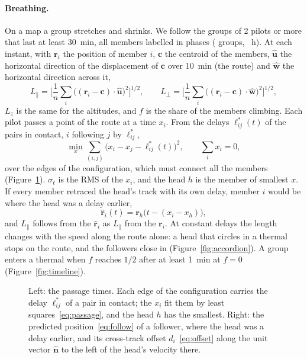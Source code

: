 \paragraph{Breathing.}\label{sec:breathing} On a map a group stretches and shrinks. We follow the
groups of 2 pilots or more that last at least 30~min, all members labelled in phases
(\StBrGroups{} groups, \StBrHours~h). At each instant, with $\mathbf r_i$ the position of member
$i$, $\mathbf c$ the centroid of the members, $\hat{\mathbf u}$ the horizontal direction of the
displacement of $\mathbf c$ over 10~min (the route) and $\hat{\mathbf w}$ the horizontal direction
across it,
\begin{equation}\label{eq:lengths}
L_\parallel=\Big[\frac1n\sum_i\big((\mathbf r_i-\mathbf c)\cdot\hat{\mathbf u}\big)^2\Big]^{1/2},
\qquad
L_\perp=\Big[\frac1n\sum_i\big((\mathbf r_i-\mathbf c)\cdot\hat{\mathbf w}\big)^2\Big]^{1/2},
\end{equation}
$L_z$ is the same for the altitudes, and $f$ is the share of the members climbing. Each pilot
passes a point of the route at a time $x_i$. From the delays $\ell^*_{ij}(t)$ of the pairs in
contact, $i$ following $j$ by $\ell^*_{ij}$,
\begin{equation}\label{eq:passage}
\min_{x}\sum_{(i,j)}\big(x_i-x_j-\ell^*_{ij}(t)\big)^2,\qquad \sum_i x_i=0,
\end{equation}
over the edges of the configuration, which must connect all the members (Figure~\ref{fig:passage}). $\sigma_\ell$ is the RMS
of the $x_i$, and the head $h$ is the member of smallest $x$. If every member retraced the head's
track with its own delay, member $i$ would be where the head was a delay earlier,
\begin{equation}\label{eq:follow}
\hat{\mathbf r}_i(t)=\mathbf r_h\big(t-(x_i-x_h)\big),
\end{equation}
and $\hat L_\parallel$ follows from the $\hat{\mathbf r}_i$ as $L_\parallel$ from the $\mathbf r_i$.
At constant delays the length changes with the speed along the route alone: a head that circles in
a thermal stops on the route, and the followers close in (Figure~\ref{fig:accordion}). A group enters a thermal when $f$
reaches $1/2$ after at least 1~min at $f=0$ (Figure~\ref{fig:timeline}).

\begin{figure}
\centering

\caption{Left: the passage times. Each edge of the configuration carries the delay $\ell^*_{ij}$ of
a pair in contact; the $x_i$ fit them by least squares~\eqref{eq:passage}, and the head $h$ has the
smallest. Right: the predicted position~\eqref{eq:follow} of a follower, where the head was a delay
earlier, and its cross-track offset $d_i$~\eqref{eq:offset} along the unit vector $\hat{\mathbf n}$
to the left of the head's velocity there.}
\label{fig:passage}
\end{figure}

